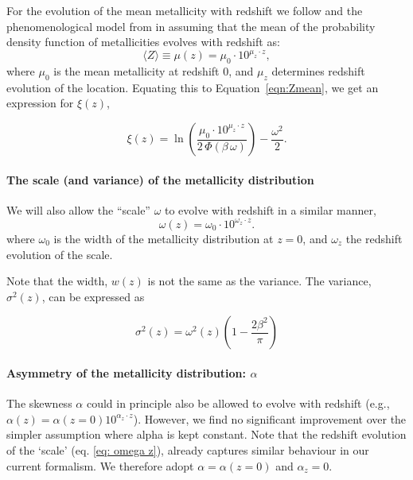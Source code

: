 \documentclass[twocolumn]{aastex631}
\begin{document}
For the evolution of the mean metallicity with redshift we follow \cite{LangerNorman2006} and the phenomenological model from \cite{Neijssel+2019} in assuming that the mean of the probability density function of metallicities evolves with redshift as:
\begin{equation}
\label{eq: mean Z}
    \langle Z \rangle \equiv \mu(z) = \mu_0 \cdot 10^{\mu_z \cdot z},
\end{equation}
where $\mu_0
$ is the mean metallicity at redshift 0, and $\mu_z
$ determines redshift evolution of the location. Equating this to Equation~\ref{eqn:Zmean}, we get an expression for $\xi(z)$,


\begin{equation}
\label{eq mu z}
    \xi(z) = \ln\left(\frac{  \mu_0 \cdot 10^{\mu_z \cdot z} }{2\, \Phi(\beta\, \omega)}  \right) - \frac{\omega^2}{2}.
\end{equation}

\paragraph{The scale (and variance) of the metallicity distribution}

We will also allow the ``scale'' $\omega$ to evolve with redshift in a similar manner, 
\begin{equation}
\label{eq: omega z}
    \omega(z) = \omega_0 \cdot 10^{\omega_z \cdot z}.
\end{equation}
where $\omega_0$ is
the width of the metallicity distribution at $z=0$, and $\omega_z$
the redshift evolution of the scale.

Note that the width, $w(z)$ is not the same as the variance. The variance, $\sigma^2(z)$, can be expressed as

\begin{equation}
    \sigma^2(z) = \omega^2(z) \left( 1 - \frac{2\beta^2}{\pi} \right)
\end{equation}

\paragraph{Asymmetry of the metallicity distribution: $\alpha$}
The skewness $\alpha$ could in principle also be allowed to evolve with redshift (e.g., $\alpha (z) = \alpha(z=0) 10^{\alpha_z \cdot z}$). 
However, we find no significant improvement over the simpler assumption where alpha is kept constant. 
Note that the redshift evolution of the `scale' (eq. \ref{eq: omega z}), already captures similar behaviour in our current formalism. We therefore adopt $ \alpha = \alpha(z=0)$ and $\alpha_z = 0$.
\end{document}
